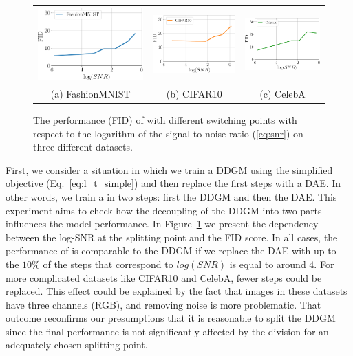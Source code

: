 \begin{figure}[t]
	\centering
	\begin{tabular}{ccc}
	    	\includegraphics[width=0.3\linewidth]{pics/4_daed/experiments/fid_snr_fmnist.pdf} & %
	     \includegraphics[width=0.3\linewidth]{pics/4_daed/experiments/fid_snr_cifar.pdf} & %
	      \includegraphics[width=0.3\linewidth]{pics/4_daed/experiments/fid_snr_celeba.pdf} \\ %
	    (a) FashionMNIST& (b) CIFAR10 & (c) CelebA 
	\end{tabular}
	\caption{ The performance (FID) of \ours{} with different switching points with respect to the logarithm of the signal to noise ratio (\protect\ref{eq:snr}) on three different datasets.}
	\label{fig:snr_fid}
	\vskip  -5pt
\end{figure}


First, we consider a situation in which we train a DDGM using the simplified objective (Eq.~\ref{eq:l_t_simple}) and then replace the first steps with a DAE. In other words, we train a \ours{} in two steps: first the DDGM and then the DAE. This experiment aims to check how the decoupling of the DDGM into two parts influences the model performance. In Figure~\ref{fig:snr_fid} we present the dependency between the log-SNR at the splitting point and the FID score. In all cases, the performance of \ours{} is comparable to the DDGM if we replace the DAE with up to the $10\%$ of the steps that correspond to $log(SNR)$ is equal to around $4$. For more complicated datasets like CIFAR10 and CelebA, fewer steps could be replaced. This effect could be explained by the fact that images in these datasets have three channels (RGB), and removing noise is more problematic. That outcome reconfirms our presumptions that it is reasonable to split the DDGM since the final performance is not significantly affected by the division for an adequately chosen splitting point.

